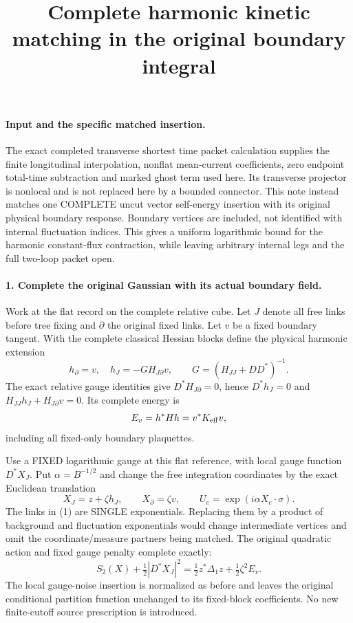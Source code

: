 \documentclass[11pt]{article}
\title{Complete harmonic kinetic matching in the original boundary integral}\author{}\date{}
\begin{document}
\maketitle
\paragraph{Input and the specific matched insertion.}
The exact completed transverse shortest time packet calculation supplies the finite longitudinal interpolation, nonflat
mean-current coefficients, zero endpoint total-time subtraction and
marked ghost term used here. Its transverse projector is nonlocal
and is not replaced here by a bounded connector.
This note instead matches one COMPLETE uncut vector self-energy insertion
with its original physical boundary response. Boundary vertices are
included, not identified with internal fluctuation indices. This gives
a uniform logarithmic bound for the harmonic constant-flux contraction,
while leaving arbitrary internal legs and the full two-loop packet open.

\paragraph{1. Complete the original Gaussian with its actual boundary field.}
Work at the flat record on the complete relative cube. Let $J$ denote
all free links before tree fixing and $\partial$ the original fixed links.
Let $v$ be a fixed boundary tangent. With the complete classical Hessian
blocks define the physical harmonic extension
\[
 h_\partial=v,\quad
 h_J=-G H_{J\partial}v,\qquad
 G=(H_{JJ}+DD^*)^{-1}.
\]
The exact relative gauge identities give
$D^*H_{J\partial}=0$, hence $D^*h_J=0$ and
$H_{JJ}h_J+H_{J\partial}v=0$.
Its complete energy is
\[
 E_v=h^*Hh=v^*K_{\rm eff}v,
\]
including all fixed-only boundary plaquettes.

Use a FIXED logarithmic gauge at this flat reference, with local gauge
function $D^*X_J$. Put $\alpha=B^{-1/2}$ and change the free integration
coordinates by the exact Euclidean translation
\[
 X_J=z+\zeta h_J,\qquad X_\partial=\zeta v,
 \qquad U_e=\exp(i\alpha X_e\cdot\sigma).
                                                                    \tag{1}
\]
The links in (1) are SINGLE exponentials. Replacing them by a product of
background and fluctuation exponentials would change intermediate
vertices and omit the coordinate/measure partners being matched.
The original quadratic action and fixed gauge penalty complete exactly:
\[
 S_2(X)+\tfrac12|D^*X_J|^2
       =\tfrac12z^*\Delta_1z+\tfrac12\zeta^2E_v.
\]
The local gauge-noise insertion is normalized as before and leaves the
original conditional partition function unchanged to its fixed-block
coefficients. No new finite-cutoff source prescription is introduced.
\end{document}
